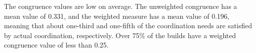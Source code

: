 \documentclass[12pt,oneside]{book}
\begin{document}
The congruence values are low on average. The unweighted congruence has a mean value of 0.331, and the weighted measure has a mean value of 0.196, meaning that about one-third and one-fifth of the coordination needs are satisfied by actual coordination, respectively. Over 75\% of the builds have a weighted congruence value of less than 0.25.

\begin{figure}[t]
  \centering
\end{figure}
\end{document}
